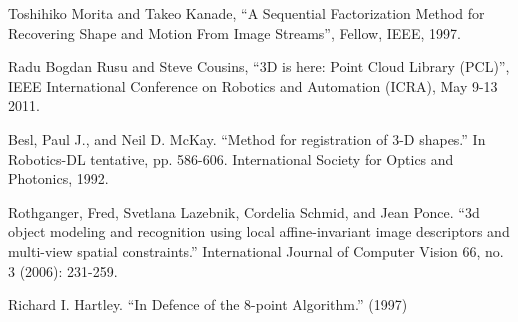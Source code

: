 \documentclass[11pt,twocolumn]{article}
\begin{document}
\begin{thebibliography}{9}

Toshihiko Morita and Takeo Kanade, ``A Sequential Factorization Method for Recovering Shape and Motion From Image Streams'', Fellow, IEEE, 1997.

Radu Bogdan Rusu and Steve Cousins, ``3D is here: Point Cloud Library (PCL)'', IEEE International Conference on Robotics and Automation (ICRA), May 9-13 2011.


Besl, Paul J., and Neil D. McKay. ``Method for registration of 3-D shapes.'' In Robotics-DL tentative, pp. 586-606. International Society for Optics and Photonics, 1992.

Rothganger, Fred, Svetlana Lazebnik, Cordelia Schmid, and Jean Ponce. ``3d object modeling and recognition using local affine-invariant image descriptors and multi-view spatial constraints.'' International Journal of Computer Vision 66, no. 3 (2006): 231-259.

Richard I. Hartley. ``In Defence of the 8-point Algorithm.'' (1997)


\end{thebibliography}
\end{document}
